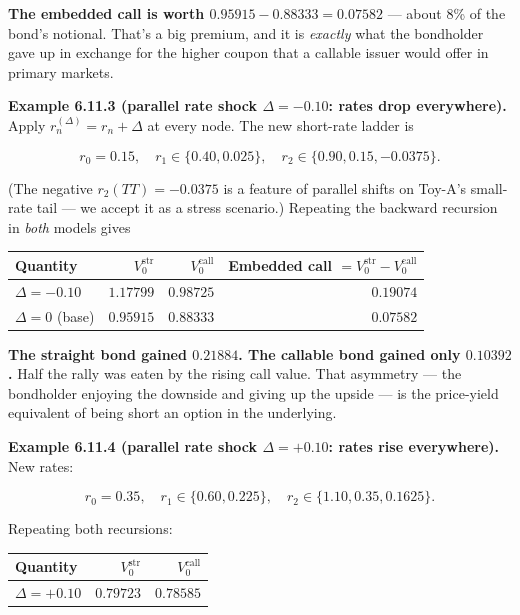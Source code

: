 \documentclass[
  10pt,
  twoside]{book}
\newcounter{none} %
\begin{document}
\textbf{The embedded call is worth \(0.95915 - 0.88333 = 0.07582\)} ---
about 8\% of the bond's notional. That's a big premium, and it is
\emph{exactly} what the bondholder gave up in exchange for the higher
coupon that a callable issuer would offer in primary markets.

\textbf{Example 6.11.3 (parallel rate shock \(\Delta = -0.10\): rates
drop everywhere).} Apply \(r_n^{(\Delta)} = r_n + \Delta\) at every
node. The new short-rate ladder is

\[r_0 = 0.15, \quad r_1 \in \{0.40, 0.025\}, \quad r_2 \in \{0.90, 0.15, -0.0375\}.\]

(The negative \(r_2(TT) = -0.0375\) is a feature of parallel shifts on
Toy-A's small-rate tail --- we accept it as a stress scenario.)
Repeating the backward recursion in \emph{both} models gives

{\def\LTcaptype{none} %
\begin{table}[H]
\centering
\begin{tabular}{|l|r|r|r|}
\toprule
Quantity & \(V_0^{\text{str}}\) & \(V_0^{\text{call}}\) & Embedded call \(= V_0^{\text{str}} - V_0^{\text{call}}\) \\
\midrule



\(\Delta = -0.10\) & \(1.17799\) & \(0.98725\) & \(0.19074\) \\
\(\Delta = 0\) (base) & \(0.95915\) & \(0.88333\) & \(0.07582\) \\
\bottomrule
\end{tabular}
\end{table}
}

\textbf{The straight bond gained \(0.21884\). The callable bond gained
only \(0.10392\).} Half the rally was eaten by the rising call value.
That asymmetry --- the bondholder enjoying the downside and giving up
the upside --- is the price-yield equivalent of being short an option in
the underlying.

\textbf{Example 6.11.4 (parallel rate shock \(\Delta = +0.10\): rates
rise everywhere).} New rates:

\[r_0 = 0.35, \quad r_1 \in \{0.60, 0.225\}, \quad r_2 \in \{1.10, 0.35, 0.1625\}.\]

Repeating both recursions:

{\def\LTcaptype{none} %
\begin{table}[H]
\centering
\begin{tabular}{|l|r|r|}
\toprule
Quantity & \(V_0^{\text{str}}\) & \(V_0^{\text{call}}\) \\
\midrule



\(\Delta = +0.10\) & \(0.79723\) & \(0.78585\) \\
\bottomrule
\end{tabular}
\end{table}
}
\end{document}
